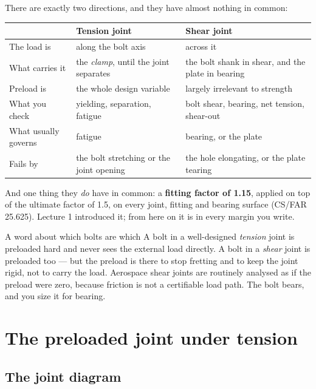 \documentclass[11pt,a4paper]{article}
\begin{document}
\medskip
There are exactly two directions, and they have almost nothing in common:

\begin{center}\footnotesize
\begin{tabular}{@{}p{3.1cm}p{5.6cm}p{6.6cm}@{}}
\toprule
 & \textbf{Tension joint} & \textbf{Shear joint}\\
\midrule
The load is & along the bolt axis & across it\\[2pt]
What carries it & the \emph{clamp}, until the joint separates & the bolt shank in shear, and the
  plate in bearing\\[2pt]
Preload is & the whole design variable & largely irrelevant to strength\\[2pt]
What you check & yielding, separation, fatigue & bolt shear, bearing, net tension, shear-out\\[2pt]
What usually governs & fatigue & bearing, or the plate\\[2pt]
Fails by & the bolt stretching or the joint opening & the hole elongating, or the plate tearing\\
\bottomrule
\end{tabular}
\end{center}

\medskip
And one thing they \emph{do} have in common: a \textbf{fitting factor of 1.15}, applied on top of
the ultimate factor of 1.5, on every joint, fitting and bearing surface (CS/FAR 25.625). Lecture 1
introduced it; from here on it is in every margin you write.

\begin{keybox}{A word about which bolts are which}
A bolt in a well-designed \emph{tension} joint is preloaded hard and never sees the external load
directly. A bolt in a \emph{shear} joint is preloaded too --- but the preload is there to stop
fretting and to keep the joint rigid, not to carry the load. Aerospace shear joints are routinely
analysed as if the preload were zero, because friction is not a certifiable load path. The bolt
bears, and you size it for bearing.
\end{keybox}

\section{The preloaded joint under tension}
\label{sec:tension}

\subsection{The joint diagram}
\end{document}
